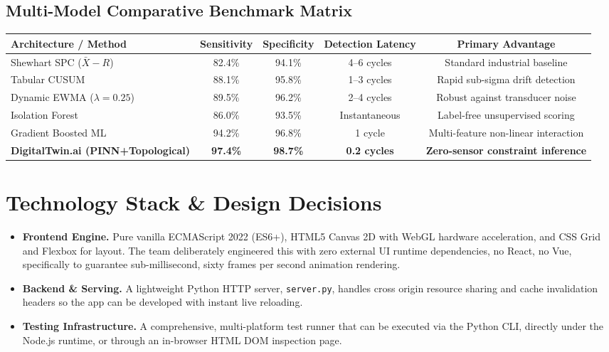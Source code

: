 \documentclass[11pt]{article}
\begin{document}
\subsection{Multi-Model Comparative Benchmark Matrix}

\begin{center}
\small
\begin{tabular}{lcccc}
\toprule
\textbf{Architecture / Method} & \textbf{Sensitivity} & \textbf{Specificity} & \textbf{Detection Latency} & \textbf{Primary Advantage} \\
\midrule
Shewhart SPC ($\bar{X}-R$) & 82.4\% & 94.1\% & 4--6 cycles & Standard industrial baseline \\
Tabular CUSUM & 88.1\% & 95.8\% & 1--3 cycles & Rapid sub-sigma drift detection \\
Dynamic EWMA ($\lambda=0.25$) & 89.5\% & 96.2\% & 2--4 cycles & Robust against transducer noise \\
Isolation Forest & 86.0\% & 93.5\% & Instantaneous & Label-free unsupervised scoring \\
Gradient Boosted ML & 94.2\% & 96.8\% & 1 cycle & Multi-feature non-linear interaction \\
\textbf{DigitalTwin.ai (PINN+Topological)} & \textbf{97.4\%} & \textbf{98.7\%} & \textbf{0.2 cycles} & \textbf{Zero-sensor constraint inference} \\
\bottomrule
\end{tabular}
\end{center}

\section{Technology Stack \& Design Decisions}

\begin{itemize}[leftmargin=1.2cm]
    \item \textbf{Frontend Engine.} Pure vanilla ECMAScript 2022 (ES6+), HTML5 Canvas 2D with WebGL hardware acceleration, and CSS Grid and Flexbox for layout. The team deliberately engineered this with zero external UI runtime dependencies, no React, no Vue, specifically to guarantee sub-millisecond, sixty frames per second animation rendering.
    \item \textbf{Backend \& Serving.} A lightweight Python HTTP server, \texttt{server.py}, handles cross origin resource sharing and cache invalidation headers so the app can be developed with instant live reloading.
    \item \textbf{Testing Infrastructure.} A comprehensive, multi-platform test runner that can be executed via the Python CLI, directly under the Node.js runtime, or through an in-browser HTML DOM inspection page.
\end{itemize}
\end{document}
